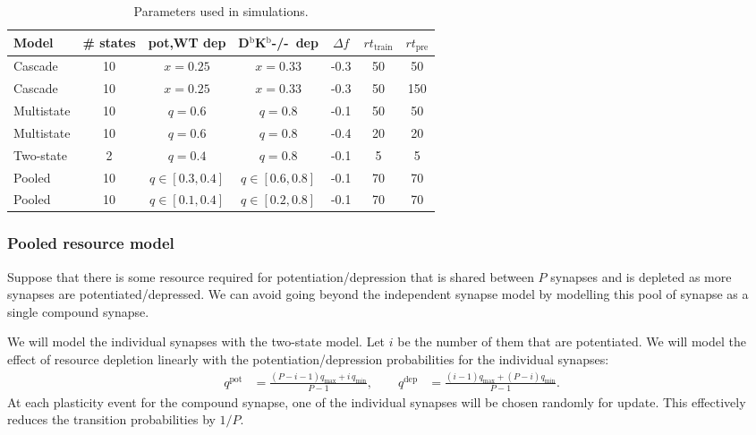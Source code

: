 \documentclass[12pt]{article}
\newcommand{\pot}{^{\text{pot}}}
\newcommand{\dep}{^{\text{dep}}}
\newcommand{\KO}{D$^\mathrm{b}$K$^\mathrm{b}$-/-}
\newcommand{\tpre}{t_{\text{pre}}}
\newcommand{\ttrain}{t_{\text{train}}}
\newcommand{\lmax}{_{\text{max}}}
\newcommand{\lmin}{_{\text{min}}}
\begin{document}
\begin{table}
 \begin{center}
  \begin{tabular}{|l|c|c|c|c|c|c|}
    \hline
    Model & \# states & pot,WT dep & \KO\ dep & $\Delta f$ & $r\ttrain$ & $r\tpre$ \\
    \hline
    Cascade    & 10 & $x=0.25$ & $x=0.33$ & -0.3 & 50 & 50  \\
    Cascade    & 10 & $x=0.25$ & $x=0.33$ & -0.3 & 50 & 150 \\
    Multistate & 10 & $q=0.6$  & $q=0.8$  & -0.1 & 50 & 50  \\
    Multistate & 10 & $q=0.6$  & $q=0.8$  & -0.4 & 20 & 20  \\
    Two-state  & 2  & $q=0.4$  & $q=0.8$  & -0.1 & 5  & 5   \\
    Pooled     & 10 & $q\in[0.3,0.4]$  & $q\in[0.6,0.8]$
                                          & -0.1 & 70 & 70 \\
    Pooled     & 10 & $q\in[0.1,0.4]$  & $q\in[0.2,0.8]$
                                          & -0.1 & 70 & 70 \\
    \hline
  \end{tabular}
 \end{center}
  \caption{Parameters used in simulations.} \label{tab:params}
\end{table}

\subsubsection{Pooled resource model}\label{sec:pooledmodel}

Suppose that there is some resource required for potentiation/depression that is shared between $P$ synapses and is depleted as more synapses are potentiated/depressed.
We can avoid going beyond the independent synapse model by modelling this pool of synapse as a single compound synapse.

We will model the individual synapses with the two-state model.
Let $i$ be the number of them that are potentiated.
We will model the effect of resource depletion linearly with the potentiation/depression probabilities for the individual synapses:
%
\begin{equation}\label{eq:depletion}
  \begin{aligned}
    q\pot &= \frac{(P-i-1)q\lmax + i\,q\lmin}{P-1}, \qquad
    q\dep &= \frac{(i-1)q\lmax + (P-i)q\lmin}{P-1}.
  \end{aligned}
\end{equation}
%
At each plasticity event for the compound synapse, one of the individual synapses will be chosen randomly for update.
This effectively reduces the transition probabilities by $1/P$.
\end{document}
